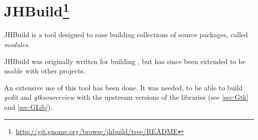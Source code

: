 
\section[JHBuild]{JHBuild\footnote{\url{http://git.gnome.org/browse/jhbuild/tree/README}}}\label{sec:jhbuild}

JHBuild is a tool designed to ease building collections of source packages, called \emph{modules}.

JHBuild was originally written for building \GNOME, but has since been extended to be usable with other projects.

An extensive use of this tool has been done. It was needed, to be able to build \emph{gedit} and \emph{gtksourceview} with the upstream versions of the libraries (see \ref{sec:Gtk} and \ref{sec:GLib}).
